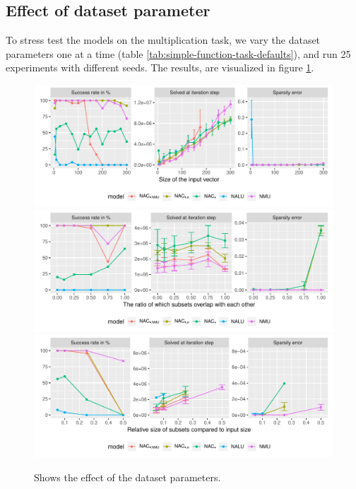 \subsection{Effect of dataset parameter}
\label{sec:appendix-simple-function-task:dataset-parameter-effect}

To stress test the models on the multiplication task, we vary the dataset parameters one at a time (table \ref{tab:simple-function-task-defaults}), and run 25 experiments with different seeds. The results, are visualized in figure \ref{fig:simple-function-static-dataset-parameters-boundary}.

\begin{figure}[h]
\centering
\includegraphics[width=\linewidth,trim={0 1.3cm 0 0},clip]{results/simple_function_static_mul_input_size.pdf}
\includegraphics[width=\linewidth,trim={0 1.3cm 0 0.809cm},clip]{results/simple_function_static_mul_overlap.pdf}
\includegraphics[width=\linewidth,trim={0 0 0 0.809cm},clip]{results/simple_function_static_mul_subset.pdf}
\caption{Shows the effect of the dataset parameters.}
\label{fig:simple-function-static-dataset-parameters-boundary}
\end{figure}


